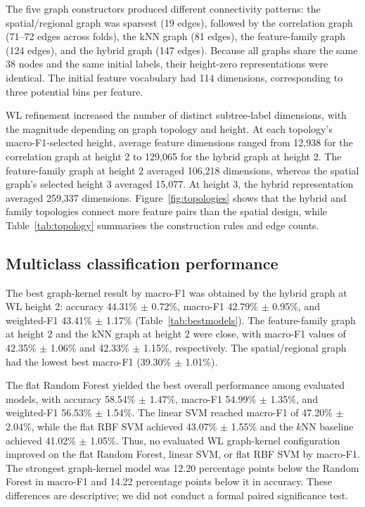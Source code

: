 \documentclass[conference]{IEEEtran}
\begin{document}
The five graph constructors produced different connectivity patterns: the spatial/regional graph was sparsest (19 edges), followed by the correlation graph (71--72 edges across folds), the kNN graph (81 edges), the feature-family graph (124 edges), and the hybrid graph (147 edges). Because all graphs share the same 38 nodes and the same initial labels, their height-zero representations were identical. The initial feature vocabulary had 114 dimensions, corresponding to three potential bins per feature.

WL refinement increased the number of distinct subtree-label dimensions, with the magnitude depending on graph topology and height. At each topology's macro-F1-selected height, average feature dimensions ranged from 12,938 for the correlation graph at height 2 to 129,065 for the hybrid graph at height 2. The feature-family graph at height 2 averaged 106,218 dimensions, whereas the spatial graph's selected height 3 averaged 15,077. At height 3, the hybrid representation averaged 259,337 dimensions. Figure~\ref{fig:topologies} shows that the hybrid and family topologies connect more feature pairs than the spatial design, while Table~\ref{tab:topology} summarises the construction rules and edge counts.

\subsection{Multiclass classification performance}

The best graph-kernel result by macro-F1 was obtained by the hybrid graph at WL height 2: accuracy 44.31\% $\pm$ 0.72\%, macro-F1 42.79\% $\pm$ 0.95\%, and weighted-F1 43.41\% $\pm$ 1.17\% (Table~\ref{tab:bestmodels}). The feature-family graph at height 2 and the kNN graph at height 2 were close, with macro-F1 values of 42.35\% $\pm$ 1.06\% and 42.33\% $\pm$ 1.15\%, respectively. The spatial/regional graph had the lowest best macro-F1 (39.30\% $\pm$ 1.01\%).

The flat Random Forest yielded the best overall performance among evaluated models, with accuracy 58.54\% $\pm$ 1.47\%, macro-F1 54.99\% $\pm$ 1.35\%, and weighted-F1 56.53\% $\pm$ 1.54\%. The linear SVM reached macro-F1 of 47.20\% $\pm$ 2.04\%, while the flat RBF SVM achieved 43.07\% $\pm$ 1.55\% and the $k$NN baseline achieved 41.02\% $\pm$ 1.05\%. Thus, no evaluated WL graph-kernel configuration improved on the flat Random Forest, linear SVM, or flat RBF SVM by macro-F1. The strongest graph-kernel model was 12.20 percentage points below the Random Forest in macro-F1 and 14.22 percentage points below it in accuracy. These differences are descriptive; we did not conduct a formal paired significance test.
\end{document}
